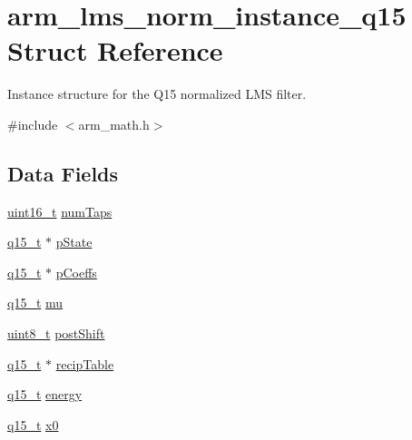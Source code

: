 \hypertarget{structarm__lms__norm__instance__q15}{\section{arm\-\_\-lms\-\_\-norm\-\_\-instance\-\_\-q15 Struct Reference}
\label{structarm__lms__norm__instance__q15}
}


Instance structure for the Q15 normalized L\-M\-S filter.  




{\ttfamily \#include $<$arm\-\_\-math.\-h$>$}

\subsection*{Data Fields}
\begin{DoxyCompactItemize}
\item 
\hyperlink{stdint_8h_a273cf69d639a59973b6019625df33e30}{uint16\-\_\-t} \hyperlink{structarm__lms__norm__instance__q15_a9ee7a45f4f315d7996a969e25fdc7146}{num\-Taps}
\item 
\hyperlink{arm__math_8h_ab5a8fb21a5b3b983d5f54f31614052ea}{q15\-\_\-t} $\ast$ \hyperlink{structarm__lms__norm__instance__q15_aa4de490b3bdbd03561b76ee07901c8e3}{p\-State}
\item 
\hyperlink{arm__math_8h_ab5a8fb21a5b3b983d5f54f31614052ea}{q15\-\_\-t} $\ast$ \hyperlink{structarm__lms__norm__instance__q15_ae7bca648c75a2ffa02d87852bb78bc8a}{p\-Coeffs}
\item 
\hyperlink{arm__math_8h_ab5a8fb21a5b3b983d5f54f31614052ea}{q15\-\_\-t} \hyperlink{structarm__lms__norm__instance__q15_a7ce00f21d11cfda6d963240641deea8c}{mu}
\item 
\hyperlink{stdint_8h_aba7bc1797add20fe3efdf37ced1182c5}{uint8\-\_\-t} \hyperlink{structarm__lms__norm__instance__q15_aa0d435fbcf7dedb7179d4467e9b79e9f}{post\-Shift}
\item 
\hyperlink{arm__math_8h_ab5a8fb21a5b3b983d5f54f31614052ea}{q15\-\_\-t} $\ast$ \hyperlink{structarm__lms__norm__instance__q15_a9aabb0e4c79f3db807e7a441fa36f5f8}{recip\-Table}
\item 
\hyperlink{arm__math_8h_ab5a8fb21a5b3b983d5f54f31614052ea}{q15\-\_\-t} \hyperlink{structarm__lms__norm__instance__q15_a1c81ded399919d8181026bc1c8602e7b}{energy}
\item 
\hyperlink{arm__math_8h_ab5a8fb21a5b3b983d5f54f31614052ea}{q15\-\_\-t} \hyperlink{structarm__lms__norm__instance__q15_a3fc1d6f97d2c6d5324871de6895cb7e9}{x0}
\end{DoxyCompactItemize}


